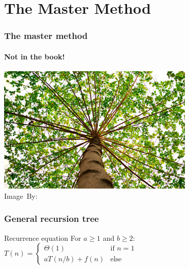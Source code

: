 \section{The Master Method}
\label{sec:the_master_method}

\begin{frame}
	\frametitle{The master method}
	\framesubtitle{Not in the book!}
	\begin{center}
		\includegraphics[width=0.7\textwidth]{figures/tree.jpg}\\
		\hspace*{15pt}\hbox{\scriptsize Image By:}
	\end{center}
\end{frame}

\begin{frame}
	\frametitle{General recursion tree}
	\begin{block}{Recurrence equation}
		For $a\geq 1$	and $b \geq 2$:\\
		$T(n) = \begin{cases}
			\Theta(1) & \text{if } n=1\\
			aT(n/b) + f(n) & \text{else}
		\end{cases}$
	\end{block}		
	\vspace{-5pt}
	
\end{frame}

